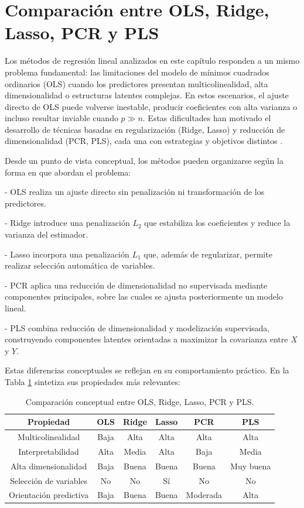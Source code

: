 \documentclass[12pt,a4paper]{report}
\begin{document}
\section{Comparación entre OLS, Ridge, Lasso, PCR y PLS}

Los métodos de regresión lineal analizados en este capítulo responden a un mismo problema fundamental: las limitaciones del modelo de mínimos cuadrados ordinarios (OLS) cuando los predictores presentan multicolinealidad, alta dimensionalidad o estructuras latentes complejas. En estos escenarios, el ajuste directo de OLS puede volverse inestable, producir coeficientes con alta varianza o incluso resultar inviable cuando \(p \gg n\). Estas dificultades han motivado el desarrollo de técnicas basadas en regularización (Ridge, Lasso) y reducción de dimensionalidad (PCR, PLS), cada una con estrategias y objetivos distintos \cite{hastie2009}.

Desde un punto de vista conceptual, los métodos pueden organizarse según la forma en que abordan el problema:

- OLS realiza un ajuste directo sin penalización ni transformación de los predictores.

- Ridge introduce una penalización \(L_2\) que estabiliza los coeficientes y reduce la varianza del estimador.

- Lasso incorpora una penalización \(L_1\) que, además de regularizar, permite realizar selección automática de variables.

- PCR aplica una reducción de dimensionalidad no supervisada mediante componentes principales, sobre las cuales se ajusta posteriormente un modelo lineal.

- PLS combina reducción de dimensionalidad y modelización supervisada, construyendo componentes latentes orientadas a maximizar la covarianza entre \(X\) y \(Y\).

Estas diferencias conceptuales se reflejan en su comportamiento práctico. En la Tabla \ref{tabla:comparacion_metodos} sintetiza sus propiedades más relevantes:

\begin{table}[H]
\centering
\small
\caption{Comparación conceptual entre OLS, Ridge, Lasso, PCR y PLS.}
\label{tabla:comparacion_metodos}
\begin{tabular}{|c|c|c|c|c|c|}
\hline
\textbf{Propiedad} & \textbf{OLS} & \textbf{Ridge} & \textbf{Lasso} & \textbf{PCR} & \textbf{PLS} \\
\hline \hline
Multicolinealidad & Baja & Alta & Alta & Alta & Alta \\ \hline
Interpretabilidad & Alta & Media & Alta & Baja & Media \\ \hline
Alta dimensionalidad & Baja & Buena & Buena & Buena & Muy buena \\ \hline
Selección de variables & No & No & Sí & No & No \\ \hline
Orientación predictiva & Baja & Buena & Buena & Moderada & Alta \\ \hline
\end{tabular}

\end{table}
\end{document}
